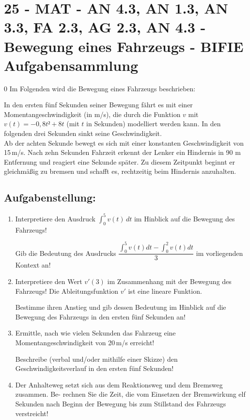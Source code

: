 \section{25 - MAT - AN 4.3, AN 1.3, AN 3.3, FA 2.3, AG 2.3, AN 4.3 - Bewegung eines Fahrzeugs - BIFIE Aufgabensammlung}

\begin{langesbeispiel} \item[0] %
				Im Folgenden wird die Bewegung eines Fahrzeugs beschrieben:
				
In den ersten fünf Sekunden seiner Bewegung fährt es mit einer Momentangeschwindigkeit
(in m/s), die durch die Funktion $v$ mit $v(t)=-0,8t²+8t$ (mit $t$ in Sekunden) modelliert werden
kann. In den folgenden drei Sekunden sinkt seine Geschwindigkeit.\\
Ab der achten Sekunde bewegt es sich mit einer konstanten Geschwindigkeit von 15\,m/s.
Nach zehn Sekunden Fahrzeit erkennt der Lenker ein Hindernis in 90 m Entfernung und reagiert eine Sekunde später. Zu diesem Zeitpunkt beginnt er gleichmäßig zu bremsen und schafft
es, rechtzeitig beim Hindernis anzuhalten.

\subsection{Aufgabenstellung:}
\begin{enumerate}
	\item Interpretiere den Ausdruck $\int^5_0{v(t)}\,dt$ im Hinblick auf die Bewegung des Fahrzeugs!
	
	Gib die Bedeutung des Ausdrucks $\dfrac{\int^5_0{v(t)dt}-\int^2_0{v(t)dt}}{3}$ im vorliegenden Kontext an!
	
	\item Interpretiere den Wert $v'(3)$ im Zusammenhang mit der Bewegung des Fahrzeugs! Die Ableitungsfunktion $v'$ ist eine lineare Funktion.
	
	Bestimme ihren Anstieg und gib dessen Bedeutung im Hinblick auf die Bewegung des Fahrzeugs in den ersten fünf Sekunden an!
	
	\item Ermittle, nach wie vielen Sekunden das Fahrzeug eine Momentangeschwindigkeit von 20\,m/s erreicht!
	
	Beschreibe (verbal und/oder mithilfe einer Skizze) den Geschwindigkeitsverlauf in den ersten fünf Sekunden!
	
	\item Der Anhalteweg setzt sich aus dem Reaktionsweg und dem Bremsweg zusammen. Be-
rechnen Sie die Zeit, die vom Einsetzen der Bremswirkung elf Sekunden nach Beginn der
Bewegung bis zum Stillstand des Fahrzeugs verstreicht!


\end{enumerate}
\end{langesbeispiel}
